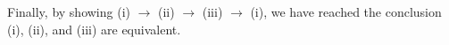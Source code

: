 \documentclass[11pt]{article}
\begin{document}
		Finally, by showing (i) $\rightarrow$ (ii) $\rightarrow$ (iii) $\rightarrow$ (i), we have reached the conclusion (i), (ii), and (iii) are equivalent.
			
	
\begin{comment}




We show that (i) $\rightarrow$ (ii) $\rightarrow$ (iii) $\rightarrow$ (i).

$A$ is countable if and only if it has the same cardinality as $\mathbb{N}$, which is $\aleph_0$, and there is a one-to-one correspondance (or a bijection) between $A$ and $\mathbb{N}$.\\
We can say that there exists a function $f: \mathbb{N} \rightarrow A$ such that\\
$\forall x\in \mathbb{N}\ \forall y\in \mathbb{N} ((f(x) = f(y)) \rightarrow x=y) \land \forall z\in A\ \exists t\in \mathbb{N} f(t) = y$ if $A$ is countable.
Notice that 

If $A$ is countable, then we can find an enumeration such that each $n_i \in \mathbb{Z^+}$ corresponds to a $m_i \in A$. Therefore we have a bijective function $g:\mathbb{Z^+} \rightarrow A$. We can have a bijective function $g$ only if there exists a surjective function $f_1:\mathbb{Z^+} \rightarrow A$. Therefore, if (i) is true, then (ii) has to be true. ((i) $\rightarrow$ (ii)).\\ 
If there exists a $f_1 : \mathbb{Z^+} \rightarrow A$, 
\end{comment}
\end{document}
